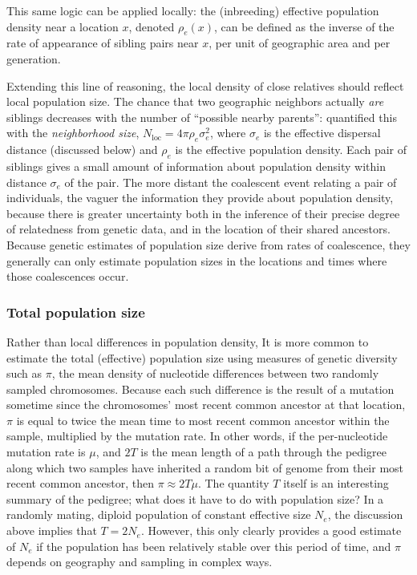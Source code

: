 \documentclass{ar-1col}
\begin{document}
This same logic can be applied locally:
the (inbreeding) effective population density
near a location $x$, denoted $\rho_e(x)$,
can be defined as the inverse of the rate of appearance of sibling pairs
near $x$, per unit of geographic area and per generation.

Extending this line of reasoning,
the local density of close relatives 
should reflect local population size.
The chance that two geographic neighbors actually \textit{are} siblings 
decreases with the number of ``possible nearby parents'':
\citet{wright1946isolation} quantified this with the
\emph{neighborhood size}, 
$N_\text{loc} = 4 \pi \rho_e \sigma_e^2$,
where $\sigma_e$ is the effective dispersal distance (discussed below)
and $\rho_e$ is the effective population density.
Each pair of siblings gives a small amount of information
about population density within distance $\sigma_e$ of the pair.
The more distant the coalescent event relating a pair of individuals, 
the vaguer the information they provide about population density,
because there is greater uncertainty 
both in the inference of their precise degree of relatedness from genetic data,
and in the location of their shared ancestors.
Because genetic estimates of population size 
derive from rates of coalescence,
they generally can only estimate population sizes 
in the locations and times where those coalescences occur.

\subsubsection{Total population size}

Rather than local differences in population density,
It is more common to estimate the total (effective) population size
using measures of genetic diversity such as $\pi$,
the mean density of nucleotide differences between two randomly sampled chromosomes.
Because each such difference is the result of a mutation
sometime since the chromosomes' most recent common ancestor at that location,
$\pi$ is equal to twice the mean time to most recent common ancestor
within the sample, multiplied by the mutation rate.
In other words, if the per-nucleotide mutation rate is $\mu$,
and $2T$ is the mean length of a path through the pedigree
along which two samples have inherited a random bit of genome
from their most recent common ancestor,
then $\pi \approx 2 T \mu$.
The quantity $T$ itself is an interesting summary of the pedigree;
what does it have to do with population size?
In a randomly mating, diploid population of constant effective size $N_e$,
the discussion above implies that $T = 2N_e$.
However, this only clearly provides a good estimate of $N_e$
if the population has been relatively stable over this period of time,
and $\pi$ depends on geography and sampling in complex ways.
\end{document}
